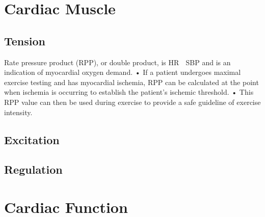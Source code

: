 \section{Cardiac Muscle}

\subsection{Tension}

Rate pressure product (RPP), or double product, is HR  SBP and is an indication of myocardial oxygen demand.
•	If a patient undergoes maximal exercise testing and has myocardial ischemia, RPP can be calculated at the point when ischemia is occurring to establish the patient’s ischemic threshold.
•	This RPP value can then be used during exercise to provide a safe guideline of exercise intensity.


\subsection{Excitation}

\subsection{Regulation}

\section{Cardiac Function}

